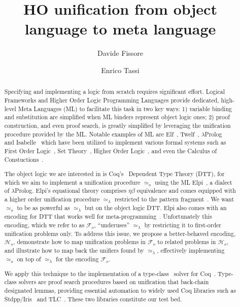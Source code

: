 \documentclass[sigconf,natbib=false,review]{acmart}
\newcommand{\UnifRel}{\ensuremath{\simeq}}
\newcommand{\Uo}{\ensuremath{\UnifRel_o}\xspace}
\newcommand{\Ue}{\ensuremath{\UnifRel_\lambda}\xspace}
\newcommand{\Fo}{\ensuremath{\mathcal{F}_{\!o}\xspace}} %
\newcommand{\Ho}{\ensuremath{\mathcal{H}_o}\xspace}
\begin{document}
\title{HO unification from object language to meta language}

\author{Davide Fissore}

\author{Enrico Tassi}

\begin{abstract}
  Specifying and implementing a logic from scratch requires significant effort.
  Logical Frameworks and Higher Order Logic Programming Languages provide
  dedicated, high-level Meta Languages (ML) to facilitate this task in two
  key ways: 1) variable binding and substitution are simplified when ML binders
  represent object logic ones; 2) proof construction, and even proof search, is
  greatly simplified by leveraging the unification procedure provided by the ML.
  Notable examples of ML are Elf~\cite{elf}, Twelf~\cite{twelf},
  $\lambda$Prolog~\cite{miller_nadathur_2012} and
  Isabelle~\cite{10.1007/978-3-540-71067-7_7}
  which have been utilized to implement various formal systems such as
  First Order Logic~\cite{felty88cade},
  Set Theory~\cite{10.1007/BF00881873},
  Higher Order Logic~\cite{books/sp/NipkowPW02}, and even the Calculus of
  Constuctions~\cite{felty93lics}.

  The object logic we are interested in is Coq's~\cite{Coq-refman}
  Dependent Type Theory (DTT),
  for which we aim to implement a unification procedure \Uo using the ML
  Elpi~\cite{dunchev15lpar}, a dialect of $\lambda$Prolog.
  Elpi's equational theory comprises
  $\eta\beta$ equivalence and comes equipped with a
  higher order unification procedure \Ue restricted to the pattern
  fragment~\cite{miller92jsc}.
  We want \Uo to be as powerful as \Ue but on the object logic DTT.
  Elpi also comes with an encoding for DTT that works well
  for meta-programming~\cite{tassi:hal-01637063,tassi:hal-01897468,gregoire:hal-03800154,newtc}.
  Unfortunately this encoding, which we refer to as \Fo,
  ``underuses'' \Ue by restricting it to first-order unification problems only.
  To address this issue, we propose a better-behaved encoding, \Ho,
  demonstrate how to map unification problems in \Fo{}
  to related problems in \Ho, and illustrate
  how to map back the unifiers found by \Ue, effectively implementing
   \Uo on top of \Ue for the encoding \Fo.

  We apply this technique to the implementation of a type-class~\cite{wadler89}
  solver for Coq~\cite{Coq-refman}.
  Type-class solvers are proof search procedures based on
  unification that back-chain designated lemmas, providing essential
  automation to widely used
  Coq libraries such as Stdpp/Iris~\cite{JUNG_KREBBERS_JOURDAN_BIZJAK_BIRKEDAL_DREYER_2018}
  and TLC~\cite{10.1007/978-3-642-14052-5_15}. These two libraries
  constitute our test bed.
\end{abstract}
\end{document}
